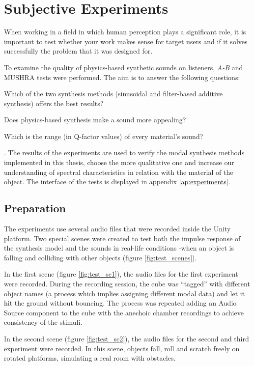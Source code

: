 \chapter{Subjective Experiments}\label{ch:tests}
When working in a field in which human perception plays a significant role, it is important to test whether your work makes sense for target users and if it solves successfully the problem that it was designed for.

To examine the quality of physics-based synthetic sounds on listeners, \textit{A-B} and \gls{MUSHRA} \cite{series2014method} tests were performed. The aim is to answer the following questions: \begin{inparaenum}[1)]
\item Which of the two synthesis methods (sinusoidal and filter-based additive synthesis) offers the best results? 
\item Does physics-based synthesis make a sound more appealing?
\item Which is the range (in Q-factor values) of every material's sound?
\end{inparaenum}.
The results of the experiments are used to verify the modal synthesis methods implemented in this thesis, choose the more qualitative one and increase our understanding of spectral characteristics in relation with the material of the object. The interface of the tests is displayed in appendix \ref{ap:experiments}.

\section{Preparation}
The experiments use several audio files that were recorded inside the Unity\textsuperscript{\textregistered} platform. Two special scenes were created to test both the impulse response of the synthesis model and the sounds in real-life conditions -when an object is falling and colliding with other objects (figure \ref{fig:test_scenes}). 

In the first scene (figure \ref{fig:test_sc1}), the audio files for the first experiment were recorded. During the recording session, the cube was ``tagged'' with different object names (a process which implies assigning different modal data) and let it hit the ground without bouncing. The process was repeated adding an Audio Source component to the cube with the anechoic chamber recordings to achieve consistency of the stimuli.

In the second scene (figure \ref{fig:test_sc2}), the audio files for the second and third experiment were recorded. In this scene, objects fall, roll and scratch freely on rotated platforms, simulating a real room with obstacles.


